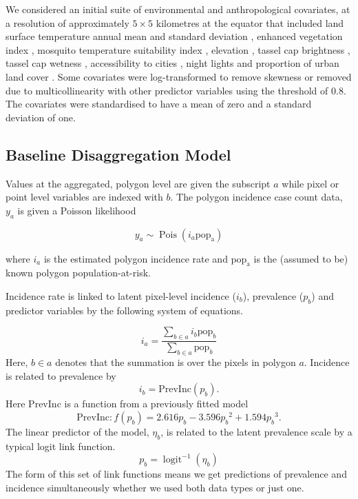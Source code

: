 \documentclass[10pt,letterpaper]{article}
\begin{document}
We considered an initial suite of environmental and anthropological covariates, at a resolution of approximately $5 \times 5$ kilometres at the equator that included land surface temperature annual mean and standard deviation \cite{LST}, enhanced vegetation index \cite{TCB}, mosquito temperature suitability index \cite{weiss2014air}, elevation \cite{SRTMElev}, tassel cap brightness \cite{TCB}, tassel cap wetness \cite{TCB}, accessibility to cities \cite{weiss2018global}, night lights \cite{elvidge2017viirs} and proportion of urban land cover \cite{GUF}. %
Some covariates were log-transformed to remove skewness or removed due to multicollinearity with other predictor variables using the threshold of 0.8. %
The covariates were standardised to have a mean of zero and a standard deviation of one.



\subsection*{Baseline Disaggregation Model}

Values at the aggregated, polygon level are given the subscript $a$ while pixel or point level variables are indexed with $b$.
The polygon incidence case count data, $y_a$ is given a Poisson likelihood

$$y_a \sim \operatorname{Pois}(i_a\mathrm{pop_a})$$

where $i_a$ is the estimated polygon incidence rate and $\mathrm{pop_a}$ is the (assumed to be) known polygon population-at-risk.


Incidence rate is linked to latent pixel-level incidence ($i_b$), prevalence ($p_b$) and predictor variables by the following system of equations.

$$i_a = \frac{ \sum_{b \in a}i_b \mathrm{pop}_b}{\sum_{b \in a}\mathrm{pop}_b} $$
Here, $b \in a$ denotes that the summation is over the pixels in polygon $a$. 
Incidence is related to prevalence by
$$i_b = \mathrm{PrevInc}(p_b).$$
Here $\mathrm{PrevInc}$ is a function from a previously fitted model \cite{cameron2015defining} 
$$\mathrm{PrevInc}: f\left(p_b\right) = 2.616p_b - 3.596{p_b}^2 + 1.594{p_b}^3.$$
The linear predictor of the model, $\eta_b$, is related to the latent prevalence scale by a typical logit link function.
$$p_b = \operatorname{logit}^{-1}(\eta_b)$$
The form of this set of link functions means we get predictions of prevalence and incidence simultaneously whether we used both data types or just one.
\end{document}
